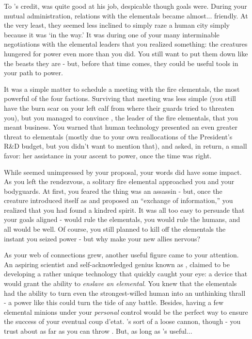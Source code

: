 \documentclass[char]{elementals}
\begin{document}
To \cLeader{}’s credit, \cLeader{\they} was quite good at his job, despicable though \cLeader{\their} goals were. During your mutual administration, relations with the elementals became almost... friendly. At the very least, they seemed less inclined to simply raze a human city simply because it was ‘in the way.’ It was during one of your many interminable negotiations with the elemental leaders that you realized something: the creatures hungered for power even more than you did. You still want to put them down like the beasts they are - but, before that time comes, they could be useful tools in your path to power.

It was a simple matter to schedule a meeting with the fire elementals, the most powerful of the four factions. Surviving that meeting was less simple (you still have the burn scar on your left calf from where their guards tried to threaten you), but you managed to convince \cQueen{}, the leader of the fire elementals, that you meant business. You warned \cQueen{\them} that human technology presented an even greater threat to elementals (mostly due to your own reallocations of the President’s R&D budget, but you didn’t want to mention that), and asked, in return, a small favor: her assistance in your ascent to power, once the time was right.

While \cQueen{} seemed unimpressed by your proposal, your words did have some impact. As you left the rendezvous, a solitary fire elemental approached you and your bodyguards. At first, you feared the thing was an assassin - but, once the creature introduced itself as \cPyro{} and proposed an “exchange of information,” you realized that you had found a kindred spirit. It was all too easy to persuade \cPyro{\them} that your goals aligned - \cPyro{\they} would rule the elementals, you would rule the humans, and all would be well. Of course, you still planned to kill off the elementals the instant you seized power - but why make your new allies nervous?

As your web of connections grew, another useful figure came to your attention. An aspiring scientist and self-acknowledged genius known as \cMS{}, \cMS{\they} claimed to be developing a rather unique technology that quickly caught your eye: a device that would grant the ability to \emph{enslave an elemental}. You knew that the elementals had the ability to turn even the strongest-willed human into an unthinking thrall - a power like this could turn the tide of any battle. Besides, having a few elemental minions under your \emph{personal} control would be the perfect way to ensure the success of your eventual coup d’etat. \cMS{\they}’s sort of a loose cannon, though - you trust \cMS{\them} about as far as you can throw \cMS{\them}. But, as long as \cMS{\they}’s useful...
\end{document}
